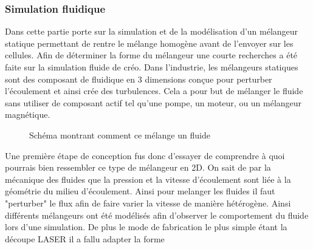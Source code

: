 \documentclass[a4paper, 11pt]{article}
\begin{document}
\subsubsection{Simulation fluidique}
Dans cette partie porte sur la simulation et de la modélisation d'un mélangeur statique 
permettant de rentre le mélange homogène avant de l'envoyer sur les cellules.
Afin de déterminer la forme du mélangeur une courte recherches a été faite sur la simulation fluide de créo.
Dans l'industrie, les mélangeurs statiques sont des composant de fluidique en 3 dimensions conçue pour 
perturber l'écoulement et ainsi crée des turbulences.
Cela a pour but de mélanger le fluide sans utiliser de composant actif tel qu'une pompe, un moteur, 
ou un mélangeur magnétique.
\begin{figure}[H]
    \centering
    \caption{Schéma montrant comment ce mélange un fluide}
    \label{fig:simulation1}
\end{figure}
Une première étape de conception fus donc d'essayer de comprendre à quoi pourrais bien ressembler ce 
type de mélangeur en 2D.
On sait de par la mécanique des fluides que la pression et la vitesse d'écoulement sont liée à la 
géométrie du milieu d'écoulement. Ainsi pour melanger les fluides il faut "perturber" le flux afin de faire
varier la vitesse de manière hétérogène.
Ainsi différents mélangeurs ont été modélisés afin d'observer le comportement du fluide lors 
d'une simulation.
De plus le mode de fabrication le plus simple étant la découpe LASER il a fallu adapter la forme 
\end{document}
